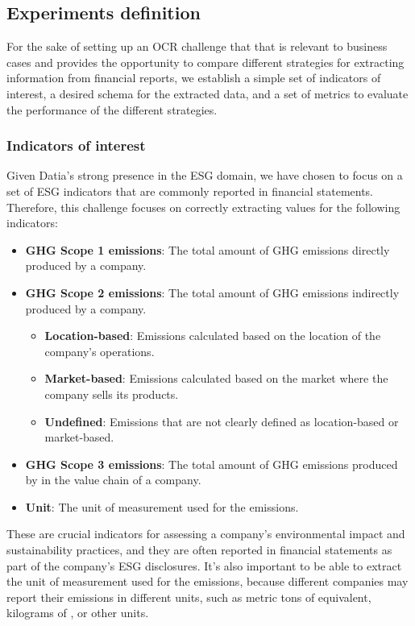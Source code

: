 \documentclass[english, 12pt, a4paper, elec, utf8, a-2b, online]{aaltothesis}
\begin{document}
\subsection{Experiments definition}

For the sake of setting up an \ac{OCR} challenge that that is relevant to business cases and provides the opportunity to compare different strategies for extracting information from financial reports, we establish a simple set of indicators of interest, a desired schema for the extracted data, and a set of metrics to evaluate the performance of the different strategies.

\subsubsection{Indicators of interest}

Given Datia's strong presence in the \ac{ESG} domain, we have chosen to focus on a set of \ac{ESG} indicators that are commonly reported in financial statements.
Therefore, this challenge focuses on correctly extracting values for the following indicators:

\begin{itemize}
    \item \textbf{\ac{GHG} Scope 1 emissions}: The total amount of \ac{GHG} emissions directly produced by a company.
    \item \textbf{\ac{GHG} Scope 2 emissions}: The total amount of \ac{GHG} emissions indirectly produced by a company.
            \begin{itemize}
                \item \textbf{Location-based}: Emissions calculated based on the location of the company's operations.
                \item \textbf{Market-based}: Emissions calculated based on the market where the company sells its products.
                \item \textbf{Undefined}: Emissions that are not clearly defined as location-based or market-based.
            \end{itemize}
    \item \textbf{\ac{GHG} Scope 3 emissions}: The total amount of \ac{GHG} emissions produced by in the value chain of a company.
    \item \textbf{Unit}: The unit of measurement used for the emissions.
\end{itemize}

These are crucial indicators for assessing a company's environmental impact and sustainability practices, and they are often reported in financial statements as part of the company's \ac{ESG} disclosures.
It's also important to be able to extract the unit of measurement used for the emissions, because different companies may report their emissions in different units, such as metric tons of  equivalent, kilograms of , or other units.
\end{document}
